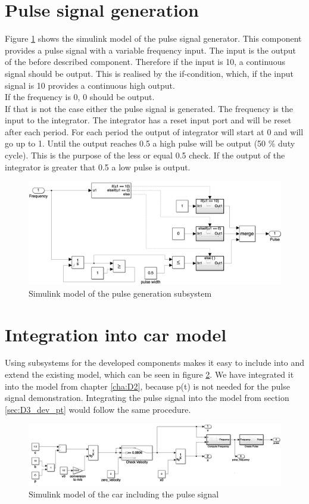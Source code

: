 \section{Pulse signal generation}\label{sec:D6Signal}
Figure \ref{fig:D6_Pulse_Signal} shows the simulink model of the pulse signal generator.
This component provides a pulse signal with a variable frequency input.
The input is the output of the before described component.
Therefore if the input is 10, a continuous signal should be output.
This is realised by the if-condition, which, if the input signal is 10 provides a continuous high output.\\
If the frequency is 0, 0 should be output.\\
If that is not the case either the pulse signal is generated.
The frequency is the input to the integrator.
The integrator has a reset input port and will be reset after each period.
For each period the output of integrator will start at 0 and will go up to 1.
Until the output reaches 0.5 a high pulse will be output (50 \% duty cycle).
This is the purpose of the less or equal 0.5 check.
If the output of the integrator is greater that 0.5 a low pulse is output.

\begin{figure}[H]
\centering
\includegraphics[width=1\textwidth]{images/D6_provide_signal.png}
\caption{Simulink model of the pulse generation subsystem}
\label{fig:D6_Pulse_Signal}
\end{figure}

\section{Integration into car model}\label{sec:D6Frequency}
Using subsystems for the developed components makes it easy to include into and extend the existing model, which can be seen in figure \ref{fig:D6_Integation}. We have integrated it into the model from chapter \ref{cha:D2}, because p(t) is not needed for the pulse signal demonstration. Integrating the pulse signal into the model from section \ref{sec:D3_dev_pt} would follow the same procedure.
\begin{figure}[H]
\centering
\includegraphics[width=1\textwidth]{images/D6_integration.png}
\caption{Simulink model of the car including the pulse signal}
\label{fig:D6_Integation}
\end{figure}

